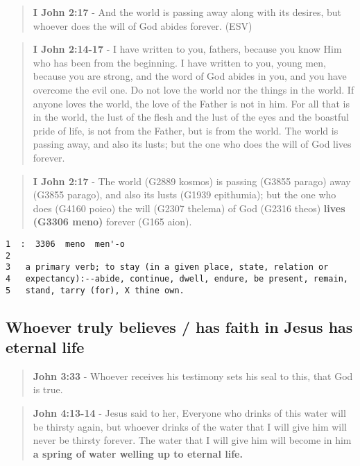 \documentclass[11pt]{article}
\begin{document}
\begin{quote}
\textbf{I John 2:17} - And the world is passing away along with its desires, but whoever does the will of God abides forever. (ESV)
\end{quote}

\begin{quote}
\textbf{I John 2:14-17} - I have written to you, fathers, because you know Him who has been from the beginning. I have written to you, young men, because you are strong, and the word of God abides in you, and you have overcome the evil one.  Do not love the world nor the things in the world. If anyone loves the world, the love of the Father is not in him.  For all that is in the world, the lust of the flesh and the lust of the eyes and the boastful pride of life, is not from the Father, but is from the world.  The world is passing away, and also its lusts; but the one who does the will of God lives forever.
\end{quote}

\begin{quote}
\textbf{I John 2:17} - The world (G2889 kosmos) is passing (G3855 parago) away (G3855 parago), and also its lusts (G1939 epithumia); but the one who does (G4160 poieo) the will (G2307 thelema) of God (G2316 theos) \textbf{lives (G3306 meno)} forever (G165 aion).
\end{quote}

\begin{verbatim}
1  :  3306  meno  men'-o
2  
3   a primary verb; to stay (in a given place, state, relation or
4   expectancy):--abide, continue, dwell, endure, be present, remain,
5   stand, tarry (for), X thine own.
\end{verbatim}

\subsection{Whoever truly believes / has faith in Jesus has eternal life}
\label{sec:org2a8a69b}

\begin{quote}
\textbf{John 3:33} - Whoever receives his testimony sets his seal to this, that God is true.
\end{quote}

\begin{quote}
\textbf{John 4:13-14} - Jesus said to her, Everyone who drinks of this water will be thirsty again, but whoever drinks of the water that I will give him will never be thirsty forever. The water that I will give him will become in him \textbf{a spring of water welling up to eternal life.}
\end{quote}
\end{document}
